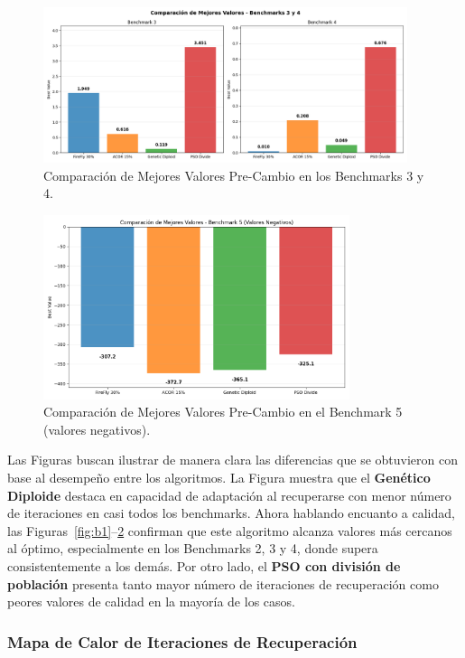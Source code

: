 \documentclass[10pt]{article}
\begin{document}
\begin{figure}[H]
    \centering
    \includegraphics[width=0.95\textwidth]{imagenes/b3_y_b4.png}
    \caption{Comparación de Mejores Valores Pre-Cambio en los Benchmarks 3 y 4.}
    \label{fig:b3b4}
\end{figure}

\begin{figure}[H]
    \centering
    \includegraphics[width=0.8\textwidth]{imagenes/b5.png}
    \caption{Comparación de Mejores Valores Pre-Cambio en el Benchmark 5 (valores negativos).}
    \label{fig:b5}
\end{figure}

Las Figuras buscan ilustrar de manera clara las diferencias que se obtuvieron con base al desempeño entre los algoritmos. La Figura muestra que el \textbf{Genético Diploide} destaca en capacidad de adaptación al recuperarse con menor número de iteraciones en casi todos los benchmarks. Ahora hablando encuanto a calidad, las Figuras~\ref{fig:b1}--\ref{fig:b5} confirman que este algoritmo alcanza valores más cercanos al óptimo, especialmente en los Benchmarks 2, 3 y 4, donde supera consistentemente a los demás. Por otro lado, el \textbf{PSO con división de población} presenta tanto mayor número de iteraciones de recuperación como peores valores de calidad en la mayoría de los casos.

\subsubsection*{Mapa de Calor de Iteraciones de Recuperación}
\end{document}
